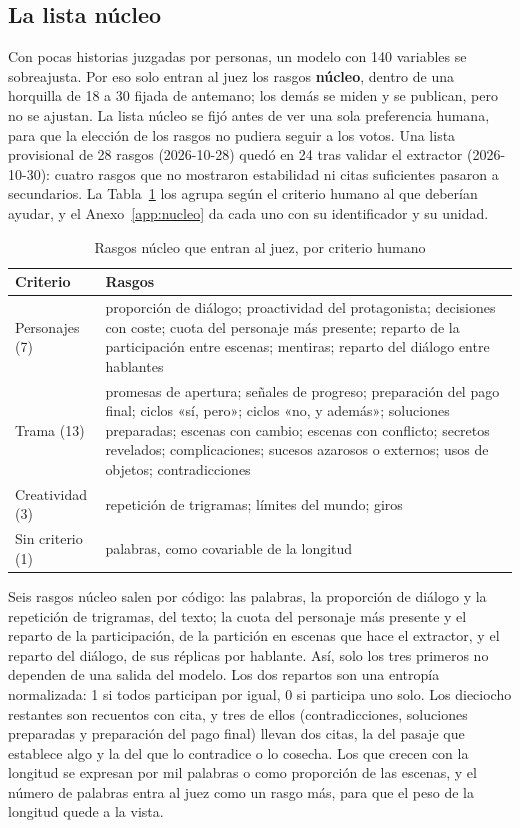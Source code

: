 \subsection{La lista núcleo}\label{sec:lista-nucleo}

Con pocas historias juzgadas por personas, un modelo con 140 variables se sobreajusta. Por eso solo
entran al juez los rasgos \textbf{núcleo}, dentro de una horquilla de 18 a 30 fijada de antemano; los
demás se miden y se publican, pero no se ajustan. La lista núcleo se fijó antes de ver una sola
preferencia humana, para que la elección de los rasgos no pudiera seguir a los votos. Una lista
provisional de 28 rasgos (2026-10-28) quedó en 24 tras validar el extractor (2026-10-30): cuatro
rasgos que no mostraron estabilidad ni citas suficientes pasaron a secundarios. La
Tabla~\ref{tab:nucleo} los agrupa según el criterio humano al que deberían ayudar, y el
Anexo~\ref{app:nucleo} da cada uno con su identificador y su unidad.

\begin{table}[htb]
  \centering
  \caption{Rasgos núcleo que entran al juez, por criterio humano}
  \label{tab:nucleo}
  \small
  \begin{tabular}{@{}>{\raggedright\arraybackslash}p{2.4cm}>{\raggedright\arraybackslash}p{11.4cm}@{}}
    \toprule
    Criterio & Rasgos \\
    \midrule
    Personajes (7) & proporción de diálogo; proactividad del protagonista; decisiones con coste;
      cuota del personaje más presente; reparto de la participación entre escenas; mentiras;
      reparto del diálogo entre hablantes \\
    Trama (13) & promesas de apertura; señales de progreso; preparación del pago final; ciclos «sí,
      pero»; ciclos «no, y además»; soluciones preparadas; escenas con cambio; escenas con
      conflicto; secretos revelados; complicaciones; sucesos azarosos o externos; usos de objetos;
      contradicciones \\
    Creatividad (3) & repetición de trigramas; límites del mundo; giros \\
    Sin criterio (1) & palabras, como covariable de la longitud \\
    \bottomrule
  \end{tabular}
\end{table}

Seis rasgos núcleo salen por código: las palabras, la proporción de diálogo y la repetición de
trigramas, del texto; la cuota del personaje más presente y el reparto de la participación, de la
partición en escenas que hace el extractor, y el reparto del diálogo, de sus réplicas por hablante.
Así, solo los tres primeros no dependen de una salida del modelo.
Los dos repartos son una entropía normalizada: 1 si todos participan por igual, 0 si participa uno
solo. Los dieciocho restantes son recuentos con cita, y tres de ellos (contradicciones, soluciones
preparadas y preparación del pago final) llevan dos citas, la del pasaje que establece algo y la del
que lo contradice o lo cosecha. Los que crecen con la longitud se expresan por mil palabras o como
proporción de las escenas, y el número de palabras entra al juez como un rasgo más, para que el peso
de la longitud quede a la vista.

